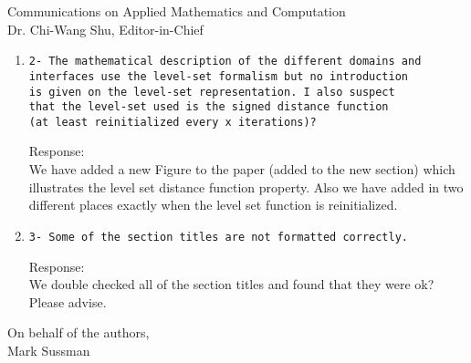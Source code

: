 \documentclass{letter}
\begin{document}
\begin{letter}{
Communications on Applied Mathematics and Computation  \\
Dr. Chi-Wang Shu, Editor-in-Chief\\}
\begin{enumerate}
\begin{verbatim}
1- The introduction goes straight to the heart of the 
problem and therefore immediately leads the 
reader to the "action". I have personnaly 
enjoyed it, but I suggest that the authors provide 
some context about free boundary problem; otherwise, 
readers less current on the literature may be disoriented. 
\end{verbatim}
\par 
\vspace{0.5cm}
Response: \\
We have added a new section ``Background - deforming boundary problems in fluid mechanics'' which addresses the reviewers' comments.
\vspace{0.5cm}
\item 
\begin{verbatim}
2- The mathematical description of the different domains and 
interfaces use the level-set formalism but no introduction 
is given on the level-set representation. I also suspect 
that the level-set used is the signed distance function 
(at least reinitialized every x iterations)?
\end{verbatim}
\par 
\vspace{0.5cm}
Response: \\
We have added a new Figure to the paper (added to the new section) which
illustrates the level set distance function property.  Also we have
added in two different places exactly when the level set function is 
reinitialized.
\vspace{0.5cm}
\item 
\begin{verbatim}
3- Some of the section titles are not formatted correctly.
\end{verbatim}
\par 
\vspace{0.5cm}
Response: \\
We double checked all of the section titles and found that they were ok?
Please advise.
\end{enumerate}

\closing{On behalf of the authors, \\ Mark Sussman}

\end{letter}




\end{document}
